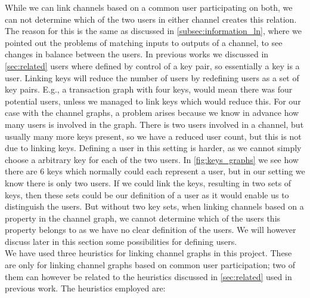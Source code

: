 While we can link channels based on a common user participating on both, we can not determine which of the two users in either channel creates this relation. 
The reason for this is the same as discussed in \cref{subsec:information_ln}, where we pointed out the problems of matching inputs to outputs of a channel, to see changes in balance between the users. 
In previous works we discussed in \cref{sec:related} users where defined by control of a key pair, so essentially a key is a user.
Linking keys will reduce the number of users by redefining users as a set of key pairs.
E.g., a transaction graph with four keys, would mean there was four potential users, unless we managed to link keys which would reduce this.
For our case with the channel graphs, a problem arises because we know in advance how many users is involved in the graph.
There is two users involved in a channel, but usually many more keys present, so we have a reduced user count, but this is not due to linking keys. Defining a user in this setting is harder, as we cannot simply choose a arbitrary key for each of the two users. In \cref{fig:keys_graphs} we see how there are 6 keys which normally could each represent a user, but in our setting we know there is only two users. If we could link the keys, resulting in two sets of keys, then these sets could be our definition of a user as it would enable us to distinguish the users. But without two key sets, when linking channels based on a property in the channel graph, we cannot determine which of the users this property belongs to as we have no clear definition of the users.
We will however discuss later in this section some possibilities for defining users.
\\

We have used three heuristics for linking channel graphs in this project.
These are only for linking channel graphs based on common user participation; two of them can however be related to the heuristics discussed in \cref{sec:related} used in previous work. The heuristics employed are:

